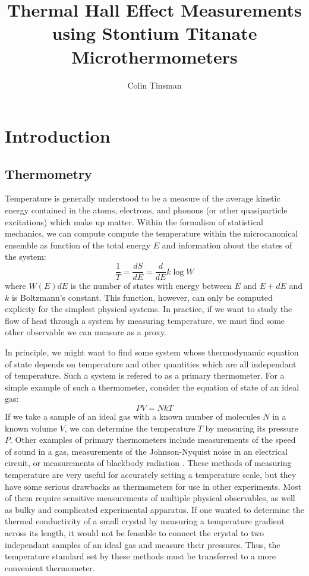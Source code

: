 \documentclass{thesis-umich}
\author{Colin Tinsman}
\title{Thermal Hall Effect Measurements using Stontium Titanate Microthermometers}
\begin{document}
\section{Introduction}

\subsection{Thermometry}

Temperature is generally understood to be a measure of the average
kinetic energy contained in the atoms, electrons, and phonons (or other
quasiparticle excitations) which make up matter. Within the formalism of
statistical mechanics, we can compute compute the temperature within the
microcanonical ensemble as function of the total energy \(E\) and
information about the states of the system:
\[\frac{1}{T} = \frac{dS}{dE} = \frac{d}{dE} k \log W\] where \(W(E)dE\)
is the number of states with energy between \(E\) and \(E+dE\) and \(k\)
is Boltzmann's constant. This function, however, can only be computed
explicity for the simplest physical systems. In practice, if we want to
study the flow of heat through a system by measuring temperature, we
must find some other observable we can measure as a proxy.

In principle, we might want to find some system whose thermodynamic
equation of state depends on temperature and other quantities which are
all independant of temperature. Such a system is refered to as a primary
thermometer. For a simple example of such a thermometer, consider the
equation of state of an ideal gas: \[PV = NkT\] If we take a sample of
an ideal gas with a known number of molecules \(N\) in a known volume
\(V\), we can determine the temperature \(T\) by measuring its pressure
\(P\). Other examples of primary thermometers include measurements of
the speed of sound in a gas, measurements of the Johnson-Nyquist noise
in an electrical circuit, or measurements of blackbody radiation
\cite{Ekin2006}. These methods of measuring temperature are very useful
for accurately setting a temperature scale, but they have some serious
drawbacks as thermometers for use in other experiments. Most of them
require sensitive measurements of multiple physical observables, as well
as bulky and complicated experimental apparatus. If one wanted to
determine the thermal conductivity of a small crystal by measuring a
temperature gradient across its length, it would not be feasable to
connect the crystal to two independant samples of an ideal gas and
measure their pressures. Thus, the temperature standard set by these
methods must be transferred to a more convenient thermometer.
\end{document}
